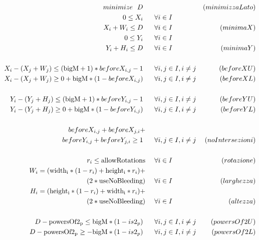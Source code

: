 \begin{align*}	%
%
%
minimize \ \ D       \ \ \ \ \   &   & \eqname{(minimizzaLato)} \\	%
%
0 \leq X_i           \ \ \ \ \   & \fori{} \\
X_i +W_i \leq D      \ \ \ \ \   & \fori{} & \eqname{(minimaX)} \\ %
0 \leq Y_i           \ \ \ \ \   & \fori{} \\
Y_i +H_i \leq D      \ \ \ \ \   & \fori{} & \eqname{(minimaY)} \\
\\
%
%
X_i - (X_j + W_j) \leq (\text{bigM}+1) *beforeX_{i,j} -1           \ \ \ \ \   &\forij{} &\eqname{(beforeXU)} \\
X_i - (X_j + W_j) \geq 0 + \text{bigM}*(1-beforeX_{i,j})       \ \ \ \ \   &\forij{} &\eqname{(beforeXL)} \\ \\
%
%
Y_i - (Y_j + H_j) \leq (\text{bigM}+1)*beforeY_{i,j} -1           \ \ \ \ \   &\forij{} &\eqname{(beforeYU)} \\
Y_i - (Y_j + H_j) \geq 0 + \text{bigM}*(1-beforeY_{i,j})       \ \ \ \ \   &\forij{} &\eqname{(beforeYL)} \\ \\
%
%
beforeX_{i,j} +beforeX_{j,i}+ \ \ \ \ & \\
beforeY_{i,j} +beforeY_{j,i} \geq 1       \ \ \ \ \   & \forij{} & \eqname{(noIntersezioni)} \\ \\
%
%
r_i \leq \text{allowRotations} \ \ \ \ & \fori{} &\eqname{(rotazione)} \\
%
W_i = (\text{\widthi}*(1-r_i) + \text{\heighti}*r_i)+ \ \ \ \ & &\\
(2*\text{useNoBleeding}) \ \ \ \ & \fori{} &\eqname{(larghezza)} \\
%
H_i = (\text{\heighti}*(1-r_i) + \text{\widthi}*r_i)+ \ \ \ \ & &\\
(2*\text{useNoBleeding}) \ \ \ \ & \fori{} &\eqname{(altezza)} \\
%
%
\\
D-\text{powersOf2\textsubscript{p}} \leq \text{bigM}*(1-is2_p)       \ \ \ \ \   & \forij{} & \eqname{(powersOf2U)} \\
D-\text{powersOf2\textsubscript{p}} \geq -\text{bigM}*(1-is2_p)       \ \ \ \ \   & \forij{} & \eqname{(powersOf2L)} \\

\end{align*}
